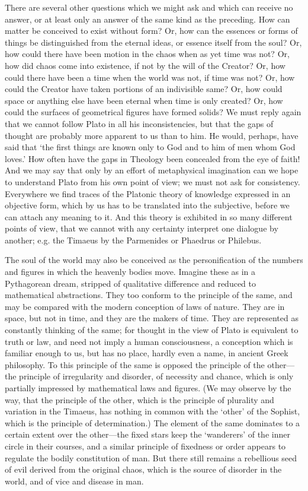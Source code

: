 There are several other questions which we might ask and which can receive
no answer, or at least only an answer of the same kind as the preceding.
How can matter be conceived to exist without form? Or, how can the
essences or forms of things be distinguished from the eternal ideas, or
essence itself from the soul? Or, how could there have been motion in the
chaos when as yet time was not? Or, how did chaos come into existence, if
not by the will of the Creator? Or, how could there have been a time when
the world was not, if time was not? Or, how could the Creator have taken
portions of an indivisible same? Or, how could space or anything else have
been eternal when time is only created? Or, how could the surfaces of
geometrical figures have formed solids? We must reply again that we cannot
follow Plato in all his inconsistencies, but that the gaps of thought are
probably more apparent to us than to him. He would, perhaps, have said
that ‘the first things are known only to God and to him of men whom God
loves.’ How often have the gaps in Theology been concealed from the eye of
faith! And we may say that only by an effort of metaphysical imagination
can we hope to understand Plato from his own point of view; we must not
ask for consistency. Everywhere we find traces of the Platonic theory of
knowledge expressed in an objective form, which by us has to be translated
into the subjective, before we can attach any meaning to it. And this
theory is exhibited in so many different points of view, that we cannot
with any certainty interpret one dialogue by another; e.g. the Timaeus by
the Parmenides or Phaedrus or Philebus.

The soul of the world may also be conceived as the personification of the
numbers and figures in which the heavenly bodies move. Imagine these as in
a Pythagorean dream, stripped of qualitative difference and reduced to
mathematical abstractions. They too conform to the principle of the same,
and may be compared with the modern conception of laws of nature. They are
in space, but not in time, and they are the makers of time. They are
represented as constantly thinking of the same; for thought in the view of
Plato is equivalent to truth or law, and need not imply a human
consciousness, a conception which is familiar enough to us, but has no
place, hardly even a name, in ancient Greek philosophy. To this principle
of the same is opposed the principle of the other—the principle of
irregularity and disorder, of necessity and chance, which is only
partially impressed by mathematical laws and figures. (We may observe by
the way, that the principle of the other, which is the principle of
plurality and variation in the Timaeus, has nothing in common with the
‘other’ of the Sophist, which is the principle of determination.) The
element of the same dominates to a certain extent over the other—the
fixed stars keep the ‘wanderers’ of the inner circle in their courses, and
a similar principle of fixedness or order appears to regulate the bodily
constitution of man. But there still remains a rebellious seed of evil
derived from the original chaos, which is the source of disorder in the
world, and of vice and disease in man.

